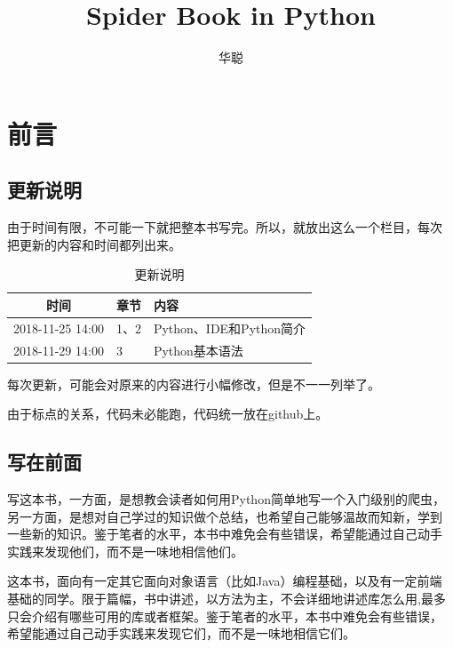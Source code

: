 \documentclass[11pt,UTF8,oneside]{mybook}
\begin{document}
\setlength{\parindent}{2em} \title{Spider Book in Python} \author{华聪}
\date{} \setlength{\parskip}{5pt} \setlength{\baselineskip}{1.5em}

\maketitle
\frontmatter



\chapter{前言}


\section{更新说明}

由于时间有限，不可能一下就把整本书写完。所以，就放出这么一个栏目，每次
把更新的内容和时间都列出来。

\begin{table}[htb]
  \centering
  \caption{更新说明}
  \begin{tabular}{clp{10cm}}
    \toprule
    时间&章节&内容\\
    \midrule
    2018-11-25 14:00&1、2&Python、IDE和Python简介\\
    2018-11-29 14:00&3&Python基本语法\\
    \bottomrule
  \end{tabular}
  
  \label{tab:update_instruction}
\end{table}
每次更新，可能会对原来的内容进行小幅修改，但是不一一列举了。

由于标点的关系，代码未必能跑，代码统一放在github上。

\section{写在前面}

写这本书，一方面，是想教会读者如何用Python简单地写一个入门级别的爬虫，
另一方面，是想对自己学过的知识做个总结，也希望自己能够温故而知新，学到
一些新的知识。鉴于笔者的水平，本书中难免会有些错误，希望能通过自己动手
实践来发现他们，而不是一味地相信他们。

这本书，面向有一定其它面向对象语言（比如Java）编程基础，以及有一定前端
基础的同学。限于篇幅，书中讲述，以方法为主，不会详细地讲述库怎么用,最多
只会介绍有哪些可用的库或者框架。鉴于笔者的水平，本书中难免会有些错误，
希望能通过自己动手实践来发现它们，而不是一味地相信它们。
\end{document}
